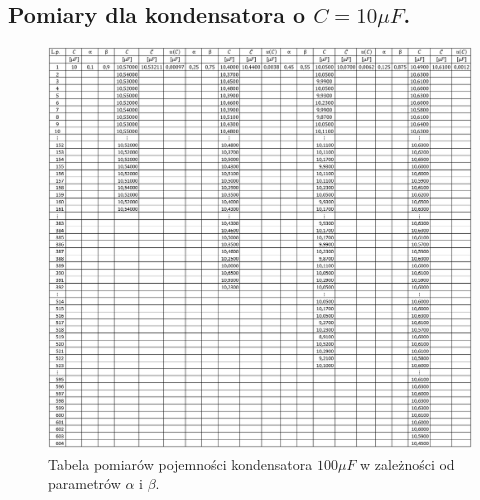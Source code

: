 \documentclass[12pt]{mwart}
\begin{document}
	\subsection{Pomiary dla kondensatora o $C=10\mu F$.}
	\begin{figure}[H]
		\centering
		\includegraphics[width=1\linewidth, height=.9\textheight]{10_tab.jpg}
		\caption{Tabela pomiarów pojemności kondensatora $100\mu F$ w zależności od parametrów $\alpha$ i $\beta$.}
	\end{figure}
		
\end{document}
